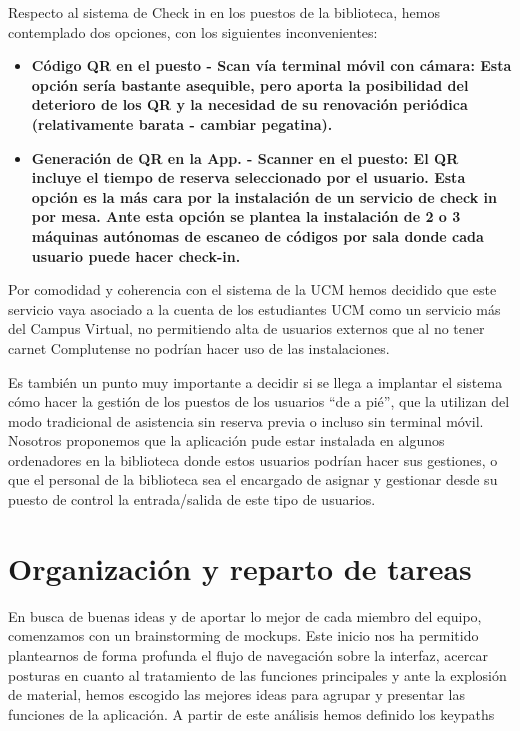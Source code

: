 \documentclass[12pt]{article}
\begin{document}
Respecto al sistema de Check in en los puestos de la biblioteca, hemos contemplado dos opciones, con los siguientes inconvenientes:

\begin{itemize}
\item \textbf{Código QR en el puesto - Scan vía terminal móvil con cámara: Esta opción sería bastante asequible, pero aporta la posibilidad del deterioro de los QR y la necesidad de su renovación periódica (relativamente barata - cambiar pegatina).}

\item \textbf{Generación de QR en la App. - Scanner en el puesto: El QR incluye el tiempo de reserva seleccionado por el usuario. Esta opción es la más cara por la instalación de un servicio de check in por mesa. Ante esta opción se plantea la instalación de 2 o 3 máquinas autónomas de escaneo de códigos por sala donde cada usuario puede hacer check-in.}
\end{itemize}

Por comodidad y coherencia con el sistema de la UCM hemos decidido que este servicio vaya asociado a la cuenta de los estudiantes UCM como un servicio más del Campus Virtual, no permitiendo alta de usuarios externos que al no tener carnet Complutense no podrían hacer uso de las instalaciones.

Es también un punto muy importante a decidir si se llega a implantar el sistema cómo hacer la gestión de los puestos de los usuarios “de a pié”, que la utilizan del modo tradicional de asistencia sin reserva previa o incluso sin terminal móvil. Nosotros proponemos que la aplicación pude estar instalada en algunos ordenadores en la biblioteca donde estos usuarios podrían hacer sus gestiones, o que el personal de la biblioteca sea el encargado de asignar y gestionar desde su puesto de control la entrada/salida de este tipo de usuarios.



\section{Organización y reparto de tareas}
En busca de buenas ideas y de aportar lo mejor de cada miembro del equipo, comenzamos con un brainstorming de mockups. Este inicio nos ha permitido plantearnos de forma profunda el flujo de navegación sobre la interfaz, acercar posturas en cuanto al tratamiento de las funciones principales y ante la explosión de material, hemos escogido las mejores ideas para agrupar y presentar las funciones de la aplicación. A partir de este análisis hemos definido los keypaths 
\end{document}
